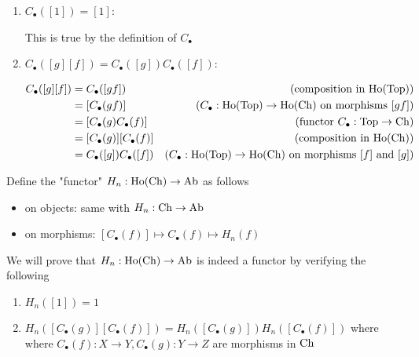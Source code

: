 \documentclass{article}
\begin{document}
\begin{longproof}
\begin{enumerate}
    \item $C_\bullet([1]) = [1]$:

    This is true by the definition of $C_\bullet$
    
    \item $C_\bullet([g][f]) = C_\bullet([g]) C_\bullet([f])$:
    
    \begin{align*}
        C_\bullet([g][f])
        &= C_\bullet([gf]) &\text{(composition in $\operatorname{Ho}(\operatorname{Top})$)} \\
        &= [C_\bullet(gf)] &\text{($C_\bullet: \operatorname{Ho}(\operatorname{Top}) \to \operatorname{Ho}(\operatorname{Ch})$ on morphisms $[gf]$)} \\
        &= [C_\bullet(g) C_\bullet(f)] &\text{(functor $C_\bullet: \operatorname{Top} \to \operatorname{Ch}$)} \\
        &= [C_\bullet(g)] [C_\bullet(f)] &\text{(composition in $\operatorname{Ho}(\operatorname{Ch})$)} \\
        &= C_\bullet([g]) C_\bullet([f]) &\text{($C_\bullet: \operatorname{Ho}(\operatorname{Top}) \to \operatorname{Ho}(\operatorname{Ch})$ on morphisms $[f]$ and $[g]$)} 
    \end{align*}

\end{enumerate}
\end{longproof}

Define the "functor" $H_n: \operatorname{Ho}(\operatorname{Ch}) \to \operatorname{Ab}$ as follows

\begin{itemize}
    \item on objects: same with $H_n: \operatorname{Ch} \to \operatorname{Ab}$
    \item on morphisms: $[C_\bullet(f)] \mapsto C_\bullet(f) \mapsto H_n(f)$
\end{itemize}

We will prove that $H_n: \operatorname{Ho}(\operatorname{Ch}) \to \operatorname{Ab}$ is indeed a functor by verifying the following

\begin{enumerate}
    \item $H_n([1]) = 1$
    \item $H_n([C_\bullet(g)][C_\bullet(f)]) = H_n([C_\bullet(g)]) H_n([C_\bullet(f)])$ where where $C_\bullet(f): X \to Y, C_\bullet(g): Y \to Z$ are morphisms in $\operatorname{Ch}$
\end{enumerate}
\end{document}
